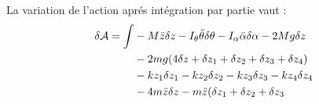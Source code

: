 \documentclass[a4paper,11pt]{amsart}
\begin{document}
La variation de l'action apr\'es int\'egration par partie vaut :
\begin{align*}
\delta\AAA = \int &
                      -M\ddot{z}\delta z 
                      - I_{\theta}\ddot{\theta}\delta\theta -
                        I_{\alpha}\ddot{\alpha}\delta\alpha -2Mg\delta z \\
                  &   -2mg(4\delta z + \delta z_{1} + \delta z_{2} 
                          +\delta z_{3} + \delta z_{4}) \\
                  &   -kz_{1}\delta z_{1} -kz_{2}\delta z_{2}
                      -kz_{3}\delta z_{3} -kz_{4}\delta z_{4} \\
                    &   -4m\ddot{z}\delta z - m\ddot{z}(\delta z_1
                                               +\delta z_2
                                               +\delta z_3

\end{align*}
\end{document}
